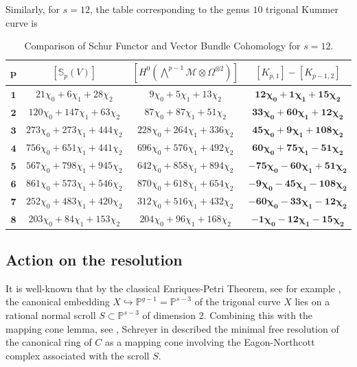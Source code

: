 \documentclass[10pt]{amsart}
\theoremstyle{definition}
\begin{document}
Similarly, for $s=12$, the table corresponding to the genus $10$ trigonal Kummer curve is
\begin{table}[h]
\centering
\renewcommand{\arraystretch}{1.5}
\begin{tabular}{|c|c|c|c|}
\hline
$\mathbf{p}$ & $[\mathbb{S}_p(V)]$ & $[H^0(\bigwedge^{p-1}\mathcal{M}\otimes\Omega^{\otimes 2})]$ & $[K_{p,1}] - [K_{p-1,2}]$ \\ \hline
$\mathbf{1}$ 
& $21\chi_0 + 6\chi_1 + 28\chi_2$ 
& $9\chi_0 + 5\chi_1 + 13\chi_2$ 
& $\mathbf{12\chi_0 + 1\chi_1 + 15\chi_2}$ \\ \hline
$\mathbf{2}$ 
& $120\chi_0 + 147\chi_1 + 63\chi_2$ 
& $87\chi_0 + 87\chi_1 + 51\chi_2$ 
& $\mathbf{33\chi_0 + 60\chi_1 + 12\chi_2}$ \\ \hline
$\mathbf{3}$ 
& $273\chi_0 + 273\chi_1 + 444\chi_2$ 
& $228\chi_0 + 264\chi_1 + 336\chi_2$ 
& $\mathbf{45\chi_0 + 9\chi_1 + 108\chi_2}$ \\ \hline
$\mathbf{4}$ 
& $756\chi_0 + 651\chi_1 + 441\chi_2$ 
& $696\chi_0 + 576\chi_1 + 492\chi_2$ 
& $\mathbf{60\chi_0 + 75\chi_1 - 51\chi_2}$ \\ \hline
$\mathbf{5}$ 
& $567\chi_0 + 798\chi_1 + 945\chi_2$ 
& $642\chi_0 + 858\chi_1 + 894\chi_2$ 
& $\mathbf{-75\chi_0 - 60\chi_1 + 51\chi_2}$ \\ \hline
$\mathbf{6}$ 
& $861\chi_0 + 573\chi_1 + 546\chi_2$ 
& $870\chi_0 + 618\chi_1 + 654\chi_2$ 
& $\mathbf{-9\chi_0 - 45\chi_1 - 108\chi_2}$ \\ \hline
$\mathbf{7}$ 
& $252\chi_0 + 483\chi_1 + 420\chi_2$ 
& $312\chi_0 + 516\chi_1 + 432\chi_2$ 
& $\mathbf{-60\chi_0 - 33\chi_1 - 12\chi_2}$ \\ \hline
$\mathbf{8}$ 
& $203\chi_0 + 84\chi_1 + 153\chi_2$ 
& $204\chi_0 + 96\chi_1 + 168\chi_2$ 
& $\mathbf{-1\chi_0 - 12\chi_1 - 15\chi_2}$ \\ \hline
\end{tabular}
\caption{Comparison of Schur Functor and Vector Bundle Cohomology for $s=12$.}\label{tab:s=12}
\end{table}

\subsection{Action on the resolution}
It is well-known that by the classical Enriques-Petri Theorem, see for example \cite{Saint-Donat73}, the canonical embedding $X\hookrightarrow\mathbb{P}^{g-1} = \mathbb{P}^{s-3}$ of the trigonal curve $X$ lies on a rational normal scroll $S \subset \mathbb{P}^{s-3}$ of dimension 2. Combining this with the mapping cone lemma, see \cite[6.15]{MR2103875}, Schreyer in \cite{MR849058} described the minimal free resolution of the canonical ring of $C$ as a mapping cone involving the Eagon-Northcott complex associated with the scroll $S$.
\end{document}
